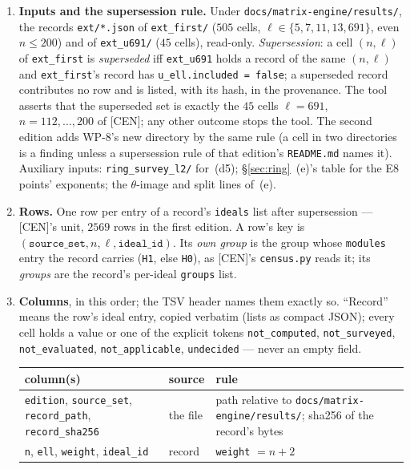 \documentclass[11pt]{article}
\theoremstyle{remark}
\begin{document}
\begin{enumerate}[label=(\alph*)]
\item \textbf{Inputs and the supersession rule.} Under \texttt{docs/matrix-engine/results/},
  the records \texttt{ext/*.json} of \texttt{ext\_first/} ($505$ cells, $\ell\in\{5,7,11,13,691\}$,
  even $n\le200$) and of \texttt{ext\_u691/} ($45$ cells), read-only. \emph{Supersession}: a cell $(n,\ell)$
  of \texttt{ext\_first} is \emph{superseded} iff \texttt{ext\_u691} holds a record of the same
  $(n,\ell)$ and \texttt{ext\_first}'s record has \texttt{u\_ell.included = false}; a superseded
  record contributes no row and is listed, with its hash, in the provenance. The tool asserts that
  the superseded set is exactly the $45$ cells $\ell=691$, $n=112,\dots,200$ of [CEN]; any other
  outcome stops the tool. The second edition adds WP-8's new directory by the same rule (a cell in
  two directories is a finding unless a supersession rule of that edition's \texttt{README.md} names
  it). Auxiliary inputs: \texttt{ring\_survey\_l2/} for~(d5); \S\ref{sec:ring}~(e)'s table for the
  E8 points' exponents; the $\theta$-image and split lines of~(e).
\item \textbf{Rows.} One row per entry of a record's \texttt{ideals} list after supersession ---
  [CEN]'s unit, $2569$ rows in the first edition. A row's key is
  $(\texttt{source\_set},n,\ell,\texttt{ideal\_id})$. Its \emph{own group} is the group whose
  \texttt{modules} entry the record carries (\texttt{H1}, else \texttt{H0}), as [CEN]'s
  \texttt{census.py} reads it; its \emph{groups} are the record's per-ideal \texttt{groups} list.
\item \textbf{Columns}, in this order; the TSV header names them exactly so. ``Record'' means the
  row's ideal entry, copied verbatim (lists as compact JSON); every cell holds a value or one of the
  explicit tokens \texttt{not\_computed}, \texttt{not\_surveyed}, \texttt{not\_evaluated},
  \texttt{not\_applicable}, \texttt{undecided} --- never an empty field.
  \begingroup\footnotesize
  \begin{longtable}{@{}>{\raggedright\arraybackslash}p{3.7cm}>{\raggedright\arraybackslash}p{3.3cm}>{\raggedright\arraybackslash}p{7.2cm}@{}}
  \toprule
  column(s) & source & rule \\
  \midrule
  \endhead
  \texttt{edition}, \texttt{source\_set}, \texttt{record\_path}, \texttt{record\_sha256} & the file & path relative to \texttt{docs/matrix-engine/results/}; sha256 of the record's bytes \\
  \texttt{n}, \texttt{ell}, \texttt{weight}, \texttt{ideal\_id} & record & \texttt{weight} $=n+2$ \\

\end{longtable}
\end{enumerate}
\end{document}
